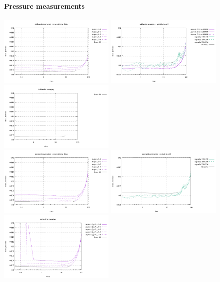 \paragraph{Pressure measurements}
\begin{center}
\includegraphics[width=5.7cm]{images/stokes_sphere_fs2D/max_pressure_arithm_comp}
\includegraphics[width=5.7cm]{images/stokes_sphere_fs2D/max_pressure_arithm_pic}
\includegraphics[width=5.7cm]{images/stokes_sphere_fs2D/max_pressure_arithm_add}\\
\includegraphics[width=5.7cm]{images/stokes_sphere_fs2D/max_pressure_geom_comp}
\includegraphics[width=5.7cm]{images/stokes_sphere_fs2D/max_pressure_geom_pic}
\includegraphics[width=5.7cm]{images/stokes_sphere_fs2D/max_pressure_geom_add}\\

\end{center}
